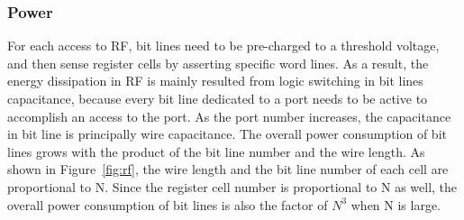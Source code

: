 \documentclass[12pt]{article}
\begin{document}
\begin{CJK}{UTF8}{bkai}
    \subsubsection{Power}
    For each access to RF, bit lines need to be pre-charged to a threshold voltage,
    and then sense register cells by asserting specific word lines.
    As a result, the energy dissipation in RF is mainly resulted from logic switching in bit lines capacitance,
    because every bit line dedicated to a port needs to be active to accomplish an access to the port.
    As the port number increases, the capacitance in bit line is principally wire capacitance.
    The overall power consumption of bit lines grows with the product of the bit line number and the wire length.
    As shown in Figure~\ref{fig:rf}, the wire length and the bit line number of each cell are proportional to N.
    Since the register cell number is proportional to N as well, 
    the overall power consumption of bit lines is also the factor of $N^3$ when N is large.

\end{CJK}
\end{document}
